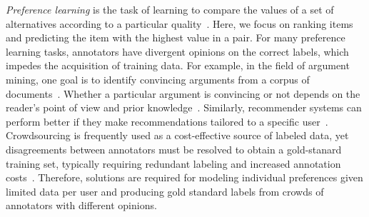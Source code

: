 %
\emph{Preference learning} is the task of learning to compare the values of a set of alternatives
according to a particular quality~\citep{furnkranz2010preference}. Here, we focus on ranking 
items and predicting the item with the highest value in a pair.
For many preference learning tasks, annotators have divergent opinions on the correct labels,
which impedes the acquisition of training data.
For example, in the field of argument mining, one goal is to 
identify convincing arguments from a corpus of documents~\citep{habernal2016argument}. 
Whether a particular argument is convincing or not depends on the reader's point of view and prior knowledge~\citep{lukin2017argument}.
Similarly, recommender systems can perform better if they make recommendations tailored
to a specific user~\citep{resnick1997recommender}.
Crowdsourcing is frequently used as a cost-effective source of labeled data, 
yet disagreements between annotators must be resolved to obtain a gold-stanard
training set, typically requiring redundant labeling and increased annotation costs~\citep{snow2008cheap,banerji2010galaxy,gaunt2016training}.
Therefore, solutions are required for modeling individual preferences given
limited data per user and producing gold standard labels from crowds of annotators with different opinions.

